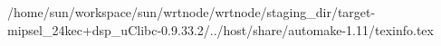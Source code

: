 /home/sun/workspace/sun/wrtnode/wrtnode/staging_dir/target-mipsel_24kec+dsp_uClibc-0.9.33.2/../host/share/automake-1.11/texinfo.tex